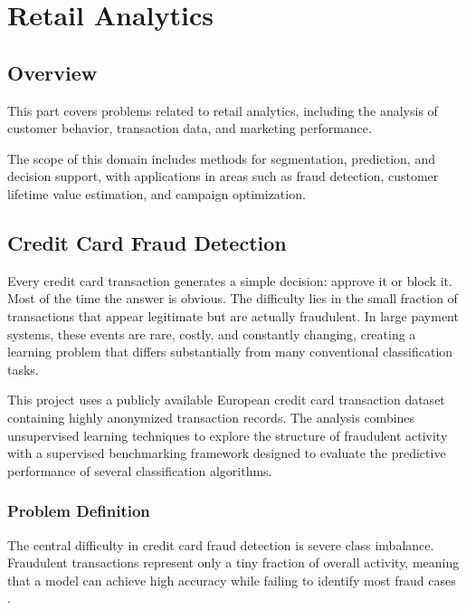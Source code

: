 \documentclass[
  12pt,
  letterpaper,
]{book}
\begin{document}
\part{Retail Analytics}

\chapter*{Overview}\label{overview-1}


This part covers problems related to retail analytics, including the
analysis of customer behavior, transaction data, and marketing
performance.

The scope of this domain includes methods for segmentation, prediction,
and decision support, with applications in areas such as fraud
detection, customer lifetime value estimation, and campaign
optimization.

\chapter{Credit Card Fraud Detection}\label{credit-card-fraud-detection}

Every credit card transaction generates a simple decision: approve it or
block it. Most of the time the answer is obvious. The difficulty lies in
the small fraction of transactions that appear legitimate but are
actually fraudulent. In large payment systems, these events are rare,
costly, and constantly changing, creating a learning problem that
differs substantially from many conventional classification tasks.

This project uses a publicly available European credit card transaction
dataset containing highly anonymized transaction records. The analysis
combines unsupervised learning techniques to explore the structure of
fraudulent activity with a supervised benchmarking framework designed to
evaluate the predictive performance of several classification
algorithms.

\section{Problem Definition}\label{problem-definition-3}

The central difficulty in credit card fraud detection is severe class
imbalance. Fraudulent transactions represent only a tiny fraction of
overall activity, meaning that a model can achieve high accuracy while
failing to identify most fraud cases
.
\end{document}
